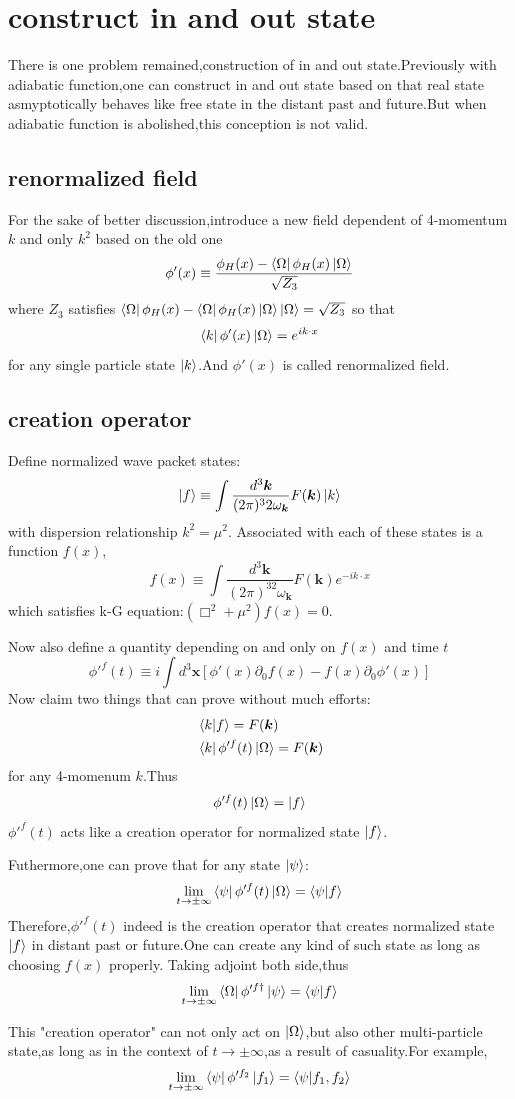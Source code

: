 \documentclass[a4paper]{article}
\begin{document}
\section{construct in and out state}
There is one problem remained,construction of in and out state.Previously with adiabatic function,one can construct in and out state based on that real state asmyptotically behaves like free state in the distant past and future.But when adiabatic function is abolished,this conception is not valid.
\subsection{renormalized field}
For the sake of better discussion,introduce a new field dependent of 4-momentum $k$ and only $k^2$ based on the old one
$$\phi'(x)\equiv\frac{\phi_H(x)-\bra{\Omega}\phi_H(x)\ket{\Omega}}{\sqrt{Z_3}}$$where $Z_3$ satisfies $\bra{\Omega}\phi_H(x)-\bra{\Omega}\phi_H(x)\ket{\Omega}\ket{\Omega}=\sqrt{Z_3}$ so that$$\bra{k}\phi'(x)\ket{\Omega}=e^{ik\cdot x}$$for any single particle state $\ket{k}$.And $\phi'(x)$ is called renormalized field.
\subsection{creation operator}
Define normalized wave packet states:$$\ket{f}\equiv\int\frac{d^3\bm{k}}{(2\pi)^32\omega_{\bm{k}}}F(\bm{k})\ket{k}$$with dispersion relationship $k^2=\mu^2$.
Associated with each of these states is a function $f(x)$,$$f(x)\equiv\int\frac{d^3\bm{k}}{(2\pi)^32\omega_{\bm{k}}}F(\bm{k})e^{-ik\cdot x}$$which satisfies k-G equation:$(\Box^2+\mu^2)f(x)=0$.
\par Now also define a quantity depending on and only on $f(x)$ and time $t$
$$\phi'^{f}(t)\equiv i\int d^3\bm{x}[\phi'(x)\partial_0f(x)-f(x)\partial_0\phi'(x)]$$
Now claim two things that can prove without much efforts:
\begin{align*}
	&\braket{k|f}=F(\bm{k})\\
	&\bra{k}\phi'^f(t)\ket{\Omega}=F(\bm{k})
\end{align*}
for any 4-momenum $k$.Thus$$\phi'^f(t)\ket{\Omega}=\ket{f}$$ $\phi'^f(t)$ acts like a creation operator for normalized state $\ket{f}$.
\par Futhermore,one can prove that for any state $\ket{\psi}$:$$\lim_{t\rightarrow\pm\infty}\bra{\psi}\phi'^f(t)\ket{\Omega}=\braket{\psi|f}$$Therefore,$\phi'^f(t)$ indeed is the creation operator that creates normalized state $\ket{f}$ in distant past or future.One can create any kind of such state as long as choosing $f(x)$ properly. Taking adjoint both side,thus$$\lim_{t\rightarrow\pm\infty}\bra{\Omega}\phi'^{f\dagger}\ket{\psi}=\braket{\psi|f}$$
\par This "creation operator" can not only act on $\ket{\Omega}$,but also other multi-particle state,as long as in the context of $t\rightarrow\pm\infty$,as a result of casuality.For example,$$\lim_{t\rightarrow\pm\infty}\bra{\psi}\phi'^{f_2}\ket{f_1}=\braket{\psi|f_1,f_2}$$
\end{document}
